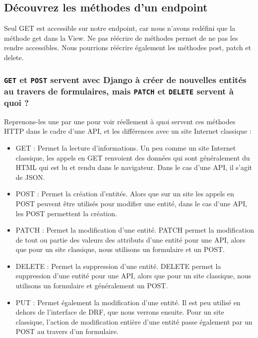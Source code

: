 \subsection{Découvrez les méthodes d’un {\color{monOrange}endpoint}}
Seul {\color{monOrange}GET} est accessible sur notre endpoint, car nous n’avons redéfini que la méthode  {\color{monOrange}get}  dans la {\color{monOrange}View}. Ne pas réécrire de méthodes permet de ne pas les rendre accessibles. Nous pourrions réécrire également les méthodes  {\color{monOrange}post,  patch}  et  {\color{monOrange}delete}. 

\subsubsection{{\tt GET} et {\tt POST} servent avec Django à créer de nouvelles entités au travers de formulaires, mais {\tt PATCH} et {\tt DELETE} servent à quoi ?}
Reprenons-les une par une pour voir réellement à quoi servent ces méthodes HTTP dans le cadre d’une API, et les différences avec un site Internet classique :
\begin{itemize}
\item {\color{monOrange}GET} : Permet la lecture d'informations.
Un peu comme un site Internet classique, les appels en GET renvoient des données qui sont généralement du HTML qui est lu et rendu dans le navigateur. Dans le cas d’une API, il s’agit de JSON.
\item {\color{monOrange}POST} : Permet la création d’entités.
Alors que sur un site les appels en POST peuvent être utilisés pour modifier une entité, dans le cas d’une API, les POST permettent la création.
\item {\color{monOrange}PATCH} : Permet la modification d’une entité.
PATCH permet la modification de tout ou partie des valeurs des attributs d’une entité pour une API, alors que pour un site classique, nous utilisons un formulaire et un POST.
\item {\color{monOrange}DELETE} : Permet la suppression d’une entité.
DELETE permet la suppression d’une entité pour une API, alors que pour un site classique, nous utilisons un formulaire et généralement un POST.
\item {\color{monOrange}PUT} : Permet également la modification d’une entité.
Il est peu utilisé en dehors de l’interface de DRF, que nous verrons ensuite. Pour un site classique, l’action de modification entière d’une entité passe également par un POST au travers d’un formulaire.
\end{itemize}

